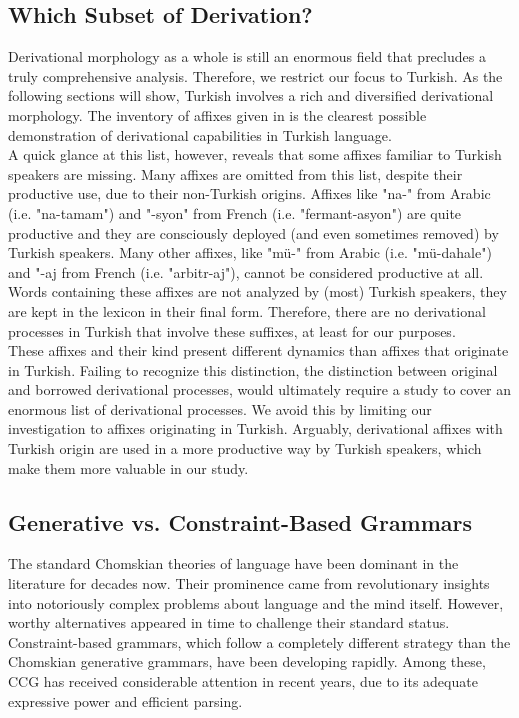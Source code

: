 \documentclass[11pt]{article} %
\begin{document}
\subsection{Which Subset of Derivation?}

\label{WhSubDeriv}

Derivational morphology as a whole is still an enormous field that precludes a truly comprehensive analysis. Therefore, we restrict our focus to Turkish. As the following sections will show, Turkish involves a rich and diversified derivational morphology. The inventory of affixes given in \citet{Bozsahin2018} is the clearest possible demonstration of derivational capabilities in Turkish language. \\

A quick glance at this list, however, reveals that some affixes familiar to Turkish speakers are missing. Many affixes are omitted from this list, despite their productive use, due to their non-Turkish origins. Affixes like "na-" from Arabic (i.e. "na-tamam") and "-syon" from French (i.e. "fermant-asyon") are quite productive and they are consciously deployed (and even sometimes removed) by Turkish speakers. Many other affixes, like "mü-" from Arabic (i.e. "mü-dahale") and "-aj from French (i.e. "arbitr-aj"), cannot be considered productive at all. Words containing these affixes are not analyzed by (most) Turkish speakers, they are kept in the lexicon in their final form. Therefore, there are no derivational processes in Turkish that involve these suffixes, at least for our purposes. \\

These affixes and their kind present different dynamics than affixes that originate in Turkish. Failing to recognize this distinction, the distinction between original and borrowed derivational processes, would ultimately require a study to cover an enormous list of derivational processes. We avoid this by limiting our investigation to affixes originating in Turkish. Arguably, derivational affixes with Turkish origin are used in a more productive way by Turkish speakers, which make them more valuable in our study. \\

\subsection{Generative vs. Constraint-Based Grammars}

The standard Chomskian theories of language have been dominant in the literature for decades now. Their prominence came from revolutionary insights into notoriously complex problems about language and the mind itself. However, worthy alternatives appeared in time to challenge their standard status. Constraint-based grammars, which follow a completely different strategy than the Chomskian generative grammars, have been developing rapidly. Among these, CCG has received considerable attention in recent years, due to its adequate expressive power and efficient parsing. \\
\end{document}
